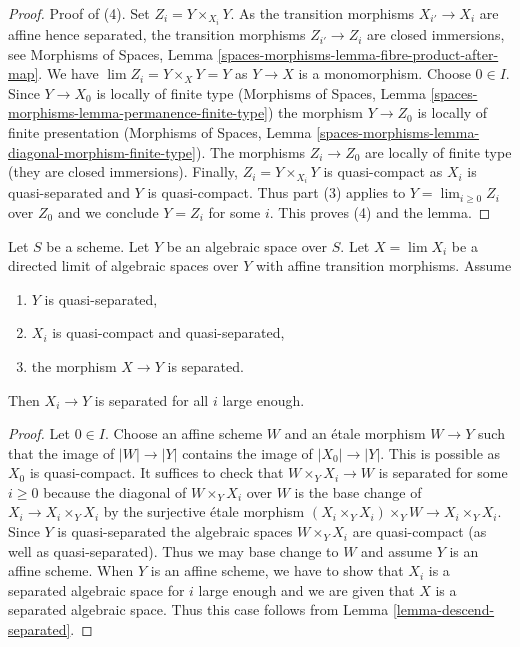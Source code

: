 \begin{proof}
\medskip\noindent
Proof of (4). Set $Z_i = Y \times_{X_i} Y$.
As the transition morphisms $X_{i'} \to X_i$ are affine hence separated,
the transition morphisms $Z_{i'} \to Z_i$ are closed immersions, see
Morphisms of Spaces, Lemma
\ref{spaces-morphisms-lemma-fibre-product-after-map}.
We have $\lim Z_i = Y \times_X Y = Y$ as $Y \to X$ is a monomorphism.
Choose $0 \in I$. Since $Y \to X_0$ is locally of finite type
(Morphisms of Spaces, Lemma
\ref{spaces-morphisms-lemma-permanence-finite-type})
the morphism $Y \to Z_0$ is locally of finite presentation
(Morphisms of Spaces, Lemma
\ref{spaces-morphisms-lemma-diagonal-morphism-finite-type}).
The morphisms $Z_i \to Z_0$ are locally of finite type
(they are closed immersions).
Finally, $Z_i = Y \times_{X_i} Y$ is quasi-compact as
$X_i$ is quasi-separated and $Y$ is quasi-compact.
Thus part (3) applies to $Y = \lim_{i \geq 0} Z_i$ over $Z_0$
and we conclude $Y = Z_i$ for some $i$. This proves (4) and the lemma.
\end{proof}

\begin{lemma}
\label{lemma-eventually-separated}
Let $S$ be a scheme. Let $Y$ be an algebraic space over $S$.
Let $X = \lim X_i$ be a directed limit of algebraic spaces over $Y$
with affine transition morphisms. Assume
\begin{enumerate}
\item $Y$ is quasi-separated,
\item $X_i$ is quasi-compact and quasi-separated,
\item the morphism $X \to Y$ is separated.
\end{enumerate}
Then $X_i \to Y$ is separated for all $i$ large enough.
\end{lemma}

\begin{proof}
Let $0 \in I$. Choose an affine scheme $W$ and an \'etale morphism
$W \to Y$ such that the image of $|W| \to |Y|$ contains the image of
$|X_0| \to |Y|$. This is possible as $X_0$ is quasi-compact.
It suffices to check that $W \times_Y X_i \to W$ is separated
for some $i \geq 0$ because the diagonal of $W \times_Y X_i$
over $W$ is the base change of $X_i \to X_i \times_Y X_i$ by
the surjective \'etale morphism $(X_i \times_Y X_i) \times_Y W \to
X_i \times_Y X_i$. Since $Y$ is quasi-separated the algebraic spaces
$W \times_Y X_i$ are quasi-compact (as well as quasi-separated).
Thus we may base change to $W$ and assume $Y$ is an affine scheme.
When $Y$ is an affine scheme, we have to show that $X_i$ is a
separated algebraic space for $i$ large enough and we are given that
$X$ is a separated algebraic space. Thus this case follows from
Lemma \ref{lemma-descend-separated}.
\end{proof}

